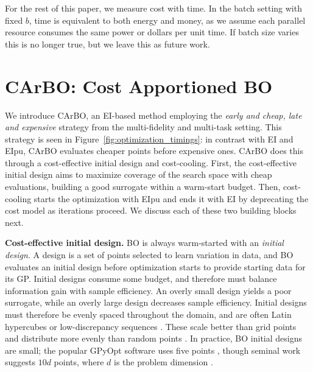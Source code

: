 \documentclass{article}
\begin{document}
For the rest of this paper, we measure cost with time. In the batch setting with fixed $b$, time is equivalent to both energy and money, as we assume each parallel resource consumes the same power or dollars per unit time. If batch size varies this is no longer true, but we leave this as future work. 

\section{CArBO: Cost Apportioned BO}\label{CArBO}

We introduce CArBO, an EI-based method employing the \textit{early and cheap, late and expensive} strategy from the multi-fidelity and multi-task setting. This strategy is seen in Figure~\ref{fig:optimization_timings}: in contrast with EI and EIpu, CArBO evaluates cheaper points before expensive ones. CArBO does this through a cost-effective initial design and cost-cooling. First, the cost-effective initial design aims to maximize coverage of the search space with cheap evaluations, building a good surrogate within a warm-start budget. Then, cost-cooling starts the optimization with EIpu and ends it with EI by deprecating the cost model as iterations proceed. We discuss each of these two building blocks next.

\textbf{Cost-effective initial design.} BO is always warm-started with an \textit{initial design}. A design is a set of points selected to learn variation in data, and BO evaluates an initial design before optimization starts to provide starting data for its GP. Initial designs consume some budget, and therefore must balance information gain with sample efficiency. An overly small design yields a poor surrogate, while an overly large design decreases sample efficiency. Initial designs must therefore be evenly spaced throughout the domain, and are often Latin hypercubes or low-discrepancy sequences \cite{kirk2012experimental, ryan2007modern}. These scale better than grid points and distribute more evenly than random points \cite{stein1987large, niederreiter1988low}. In practice, BO initial designs are small; the popular GPyOpt software uses five points \cite{gpyopt2016}, though seminal work suggests $10d$ points, where $d$ is the problem dimension \cite{jones1998ego}. 
\end{document}
